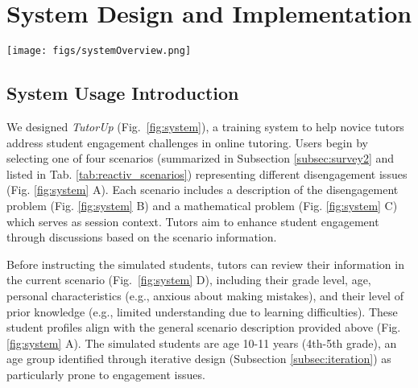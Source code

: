 \section{System Design and Implementation}
\label{sec:system_design}


\begin{figure*}
    \centering
    \texttt{[image: figs/systemOverview.png]}
    \caption{\textbf{TutorUp} consists of multiple views and functions, including Scenario Selection (A), Scenario Description (B), Math Problem (C), and Student Information (D), which displays details for three students (D1, D2, and D3) under each scenario. The system also features an Interactive Dialogue (E), an Input Box for Tutor Instructions (F), a Get Immediate Feedback Button (G1) that provides Immediate Feedback (G2), a Reset Button (H), and a Get Asynchronous Feedback Button (J1) that provides Asynchronous Feedback (J2). Users can also click on Tutor Dialogue Bubbles To Retrieve the Instruction (I)}
    \label{fig:system}
\end{figure*} 


\subsection{System Usage Introduction}
We designed \textit{TutorUp}  (Fig.~\ref{fig:system}), a training system to help novice tutors address student engagement challenges in online tutoring. 
Users begin by selecting one of four scenarios (summarized in Subsection \ref{subsec:survey2} and listed in Tab. \ref{tab:reactiv_scenarios}) representing different disengagement issues (Fig. \ref{fig:system} A). Each scenario includes a description of the disengagement problem (Fig. \ref{fig:system} B) and a mathematical problem (Fig. \ref{fig:system} C) which serves as session context. Tutors aim to enhance student engagement through discussions based on the scenario information.

Before instructing the simulated students, tutors can review their information in the current scenario (Fig.~\ref{fig:system} D), including their grade level, age, personal characteristics (e.g., anxious about making mistakes), and their level of prior knowledge (e.g., limited understanding due to learning difficulties). These student profiles align with the general scenario description provided above (Fig. \ref{fig:system} A). The simulated students are age 10-11 years (4th-5th grade), an age group identified through iterative design (Subsection \ref{subsec:iteration}) as particularly prone to engagement issues.


